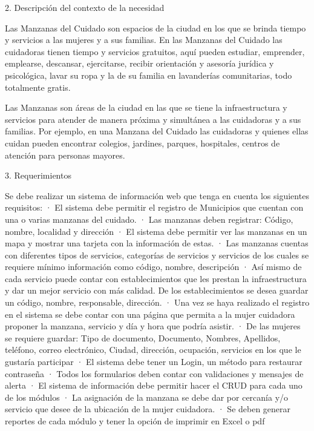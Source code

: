 2.    Descripción del contexto de la necesidad
 
Las Manzanas del Cuidado son espacios de la ciudad en los que se brinda tiempo y servicios a las mujeres y a sus familias.
En las Manzanas del Cuidado las cuidadoras tienen tiempo y servicios gratuitos, aquí pueden estudiar, emprender, emplearse, descansar, ejercitarse, recibir orientación y asesoría jurídica y psicológica, lavar su ropa y la de su familia en lavanderías comunitarias, todo totalmente gratis.
 
Las Manzanas son áreas de la ciudad en las que se tiene la infraestructura y servicios para atender de manera próxima y simultánea a las cuidadoras y a sus familias. Por ejemplo, en una Manzana del Cuidado las cuidadoras y quienes ellas cuidan pueden encontrar colegios, jardines, parques, hospitales, centros de atención para personas mayores.
 
3.    Requerimientos
 
Se debe realizar un sistema de información web que tenga en cuenta los siguientes requisitos:
·	El sistema debe permitir el registro de Municipios que cuentan con una o varias manzanas del cuidado. 
·	Las manzanas deben registrar: Código, nombre, localidad y dirección
·	El sistema debe permitir ver las manzanas en un mapa y mostrar una tarjeta con la información de estas.
·	Las manzanas cuentas con diferentes tipos de servicios, categorías de servicios y servicios de los cuales se requiere mínimo información como código, nombre, descripción
·	Así mismo de cada servicio puede contar con establecimientos que les prestan la infraestructura y dar un mejor servicio con más calidad. De los establecimientos se desea guardar un código, nombre, responsable, dirección.
·	Una vez se haya realizado el registro en el sistema se debe contar con una página que permita a la mujer cuidadora proponer la manzana, servicio y día y hora que podría asistir.
·	De las mujeres se requiere guardar: Tipo de documento, Documento, Nombres, Apellidos, teléfono, correo electrónico, Ciudad, dirección, ocupación, servicios en los que le gustaría participar 
·	El sistema debe tener un Login, un método para restaurar contraseña 
·	Todos los formularios deben contar con validaciones y mensajes de alerta
·	El sistema de información debe permitir hacer el CRUD para cada uno de los módulos
·	La asignación de la manzana se debe dar por cercanía y/o servicio que desee de la ubicación de la mujer cuidadora.
·	Se deben generar reportes de cada módulo y tener la opción de imprimir en Excel o pdf
 
